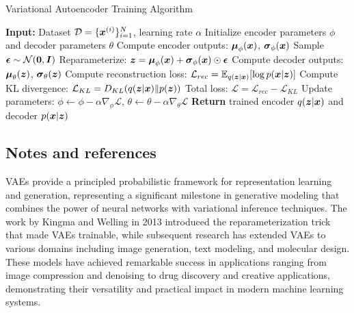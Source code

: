 \begin{algorithm}[htbp]
\caption{Variational Autoencoder Training Algorithm}
\label{alg:vae-training}
\begin{algorithmic}[1]
\State \textbf{Input:} Dataset $\mathcal{D} = \{\boldsymbol{x}^{(i)}\}_{i=1}^{N}$, learning rate $\alpha$
\State Initialize encoder parameters $\phi$ and decoder parameters $\theta$
        \State Compute encoder outputs: $\boldsymbol{\mu}_{\phi}(\boldsymbol{x})$, $\boldsymbol{\sigma}_{\phi}(\boldsymbol{x})$
        \State Sample $\boldsymbol{\epsilon} \sim \mathcal{N}(\boldsymbol{0}, \boldsymbol{I})$
        \State Reparameterize: $\boldsymbol{z} = \boldsymbol{\mu}_{\phi}(\boldsymbol{x}) + \boldsymbol{\sigma}_{\phi}(\boldsymbol{x}) \odot \boldsymbol{\epsilon}$
        \State Compute decoder outputs: $\boldsymbol{\mu}_{\theta}(\boldsymbol{z})$, $\boldsymbol{\sigma}_{\theta}(\boldsymbol{z})$
        \State Compute reconstruction loss: $\mathcal{L}_{rec} = \mathbb{E}_{q(\boldsymbol{z}|\boldsymbol{x})}[\log p(\boldsymbol{x}|\boldsymbol{z})]$
        \State Compute KL divergence: $\mathcal{L}_{KL} = D_{KL}(q(\boldsymbol{z}|\boldsymbol{x}) \| p(\boldsymbol{z}))$
        \State Total loss: $\mathcal{L} = \mathcal{L}_{rec} - \mathcal{L}_{KL}$
        \State Update parameters: $\phi \leftarrow \phi - \alpha \nabla_{\phi} \mathcal{L}$, $\theta \leftarrow \theta - \alpha \nabla_{\theta} \mathcal{L}$
    \EndFor
\EndFor
\State \textbf{Return} trained encoder $q(\boldsymbol{z}|\boldsymbol{x})$ and decoder $p(\boldsymbol{x}|\boldsymbol{z})$
\end{algorithmic}
\end{algorithm}

\subsection{Notes and references}

VAEs provide a principled probabilistic framework for representation learning and generation, representing a significant milestone in generative modeling that combines the power of neural networks with variational inference techniques. The work by Kingma and Welling in 2013 introduced the reparameterization trick that made VAEs trainable, while subsequent research has extended VAEs to various domains including image generation, text modeling, and molecular design. These models have achieved remarkable success in applications ranging from image compression and denoising to drug discovery and creative applications, demonstrating their versatility and practical impact in modern machine learning systems.

